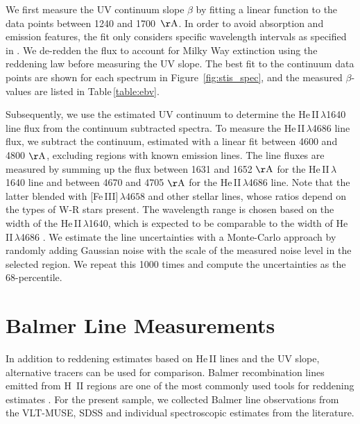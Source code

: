 \documentclass[]{aastex63}
\begin{document}
We first measure the UV continuum slope $\beta$ by fitting a linear function to the data points between 1240 and 1700~${\rm \AA}$. In order to avoid absorption and emission features, the fit only considers specific wavelength intervals as specified in \citet{calzetti_dust_1994}. 
We de-redden the flux to account for Milky Way extinction using the \cite{cardelli_relationship_1989} reddening law before measuring the UV slope.
The best fit to the continuum data points are shown for each spectrum in Figure~\ref{fig:stis_spec}, and the measured $\beta$-values are listed in Table\,\ref{table:ebv}. 

Subsequently, we use the estimated UV continuum to determine the He\,II\,$\lambda$1640 line flux from the continuum subtracted spectra. To measure the He\,II\,$\lambda$4686 line flux, we subtract the continuum, estimated with a linear fit between 4600 and 4800 ${\rm \AA}$, excluding regions with known emission lines. 
The line fluxes are measured by summing up the flux between 1631 and 1652 ${\rm \AA}$ for the He\,II\,$\lambda$1640 line and between 4670 and 4705 ${\rm \AA}$ for the He\,II\,$\lambda$4686 line. Note that the latter blended with [Fe\,III]\,$\lambda4658$ and other stellar lines, whose ratios depend on the types of W-R stars present. The wavelength range is chosen based on the width of the He\,II\,$\lambda$1640, which is expected to be comparable to the width of He\,II\,$\lambda$4686 \citep{leitherer_he_2019,hillier_empirical_1987}.
We estimate the line uncertainties with a Monte-Carlo approach by randomly adding Gaussian noise with the scale of the measured noise level in the selected region. We repeat this 1000 times and compute the uncertainties as the 68-percentile.


\section{Balmer Line Measurements}\label{sect:balmer_line}
In addition to reddening estimates based on He\,II lines and the UV slope, alternative tracers can be used for comparison. Balmer recombination lines emitted from H~II regions are one of the most commonly used tools for reddening estimates \citep[e.g.][]{dominguez_dust_2013,momcheva_nebular_2013}. 
For the present sample, we collected Balmer line observations from the VLT-MUSE, SDSS and individual spectroscopic estimates from the literature.
\end{document}

